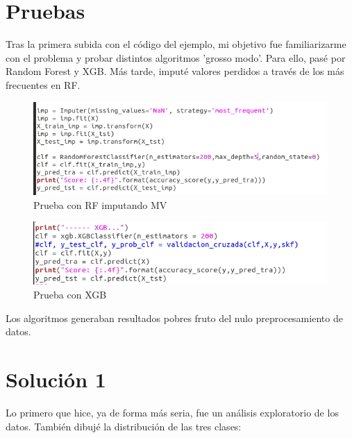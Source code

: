 \section{Pruebas}

Tras la primera subida con el código del ejemplo, mi objetivo fue familiarizarme con el problema y probar distintos algoritmos 'grosso modo'. Para ello, pasé por Random Forest y XGB. Más tarde, imputé valores perdidos a través de los más frecuentes en RF.

\begin{figure}[H] %
	\centering
	\includegraphics[scale=0.5]{rfimp.png}  %
	\caption{Prueba con RF imputando MV} 
	\label{fig:RF1}
\end{figure}

\begin{figure}[H] %
	\centering
	\includegraphics[scale=0.6]{xgb1.png}  %
	\caption{Prueba con XGB} 
	\label{fig:xgb1}
\end{figure}

Los algoritmos generaban resultados pobres fruto del nulo preprocesamiento de datos. 

\section{Solución 1}

Lo primero que hice, ya de forma más seria, fue un análisis exploratorio de los datos. También dibujé la distribución de las tres clases:

